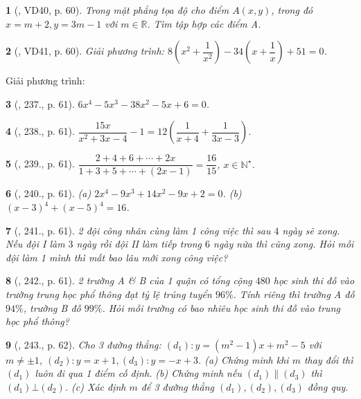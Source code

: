 \documentclass{article}
\newtheorem{baitoan}{}
\begin{document}
\begin{baitoan}[\cite{Tuyen_Toan_8}, VD40, p. 60]
	Trong mặt phẳng tọa độ cho điểm $A(x,y)$, trong đó $x = m + 2,y = 3m - 1$ với $m\in\mathbb{R}$. Tìm tập hợp các điểm A.
\end{baitoan}

\begin{baitoan}[\cite{Tuyen_Toan_8}, VD41, p. 60]
	Giải phương trình: $8\left(x^2 + \dfrac{1}{x^2}\right) - 34\left(x + \dfrac{1}{x}\right) + 51 = 0$.
\end{baitoan}
Giải phương trình:

\begin{baitoan}[\cite{Tuyen_Toan_8}, 237., p. 61]
	$6x^4 - 5x^3 - 38x^2 - 5x + 6 = 0$.
\end{baitoan}

\begin{baitoan}[\cite{Tuyen_Toan_8}, 238., p. 61]
	$\dfrac{15x}{x^2 + 3x - 4} - 1 = 12\left(\dfrac{1}{x + 4} + \dfrac{1}{3x - 3}\right)$.
\end{baitoan}

\begin{baitoan}[\cite{Tuyen_Toan_8}, 239., p. 61]
	$\dfrac{2 + 4 + 6 + \cdots + 2x}{1 + 3 + 5 + \cdots + (2x - 1)} = \dfrac{16}{15}$, $x\in\mathbb{N}^\star$.
\end{baitoan}

\begin{baitoan}[\cite{Tuyen_Toan_8}, 240., p. 61]
	(a) $2x^4 - 9x^3 + 14x^2 - 9x + 2 = 0$. (b) $(x - 3)^4 + (x - 5)^4 = 16$.
\end{baitoan}

\begin{baitoan}[\cite{Tuyen_Toan_8}, 241., p. 61]
	2 đội công nhân cùng làm 1 công việc thì sau $4$ ngày sẽ xong. Nếu đội I làm $3$ ngày rồi đội II làm tiếp trong $6$ ngày nữa thì cũng xong. Hỏi mỗi đội làm 1 mình thì mất bao lâu mới xong công việc?
\end{baitoan}

\begin{baitoan}[\cite{Tuyen_Toan_8}, 242., p. 61]
	2 trường A \& B của 1 quận có tổng cộng $480$ học sinh thi đỗ vào trường trung học phổ thông đạt tỷ lệ trúng tuyển $96\%$. Tính riêng thì trường A đỗ $94\%$, trường B đỗ $99\%$. Hỏi mỗi trường có bao nhiêu học sinh thi đỗ vào trung học phổ thông?
\end{baitoan}

\begin{baitoan}[\cite{Tuyen_Toan_8}, 243., p. 62]
	Cho 3 đường thẳng: $(d_1):y = (m^2 - 1)x + m^2 - 5$ với $m\ne\pm1$, $(d_2):y = x + 1,(d_3):y = -x + 3$. (a) Chứng minh khi $m$ thay đổi thì $(d_1)$ luôn đi qua 1 điểm cố định. (b) Chứng minh nếu $(d_1)\parallel(d_3)$ thì $(d_1)\bot(d_2)$. (c) Xác định $m$ để 3 đường thẳng $(d_1),(d_2),(d_3)$ đồng quy.
\end{baitoan}
\end{document}
